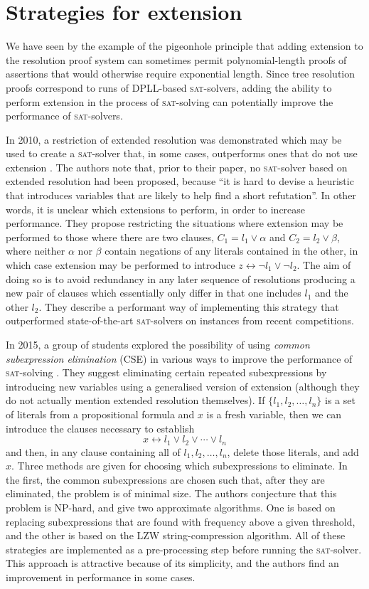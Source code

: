 \documentclass[proof,pdftex,11pt,a4]{article}
\newcommand{\sat}{\textsc{sat}}
\begin{document}
\section{Strategies for extension}

We have seen by the example of the pigeonhole principle that adding extension to the resolution proof system can sometimes permit polynomial-length proofs of assertions that would otherwise require exponential length. Since tree resolution proofs correspond to runs of DPLL-based \sat{}-solvers, adding the ability to perform extension in the process of \sat{}-solving can potentially improve the performance of \sat{}-solvers.

In 2010, a restriction of extended resolution was demonstrated which may be used to create a \sat{}-solver that, in some cases, outperforms ones that do not use extension \cite{Audemard:2010}. The authors note that, prior to their paper, no \sat{}-solver based on extended resolution had been proposed, because ``it is hard to devise a heuristic that introduces variables that are likely to help find a short refutation''. In other words, it is unclear which extensions to perform, in order to increase performance. They propose restricting the situations where extension may be performed to those where there are two clauses, $C_1 = l_1 \vee \alpha$ and $C_2 = l_2 \vee \beta$, where neither $\alpha$ nor $\beta$ contain negations of any literals contained in the other, in which case extension may be performed to introduce $z \leftrightarrow \neg l_1 \vee \neg l_2$. The aim of doing so is to avoid redundancy in any later sequence of resolutions producing a new pair of clauses which essentially only differ in that one includes $l_1$ and the other $l_2$. They describe a performant way of implementing this strategy that outperformed state-of-the-art \sat{}-solvers on instances from recent competitions.

In 2015, a group of students explored the possibility of using \emph{common subexpression elimination} (CSE) in various ways to improve the performance of \sat{}-solving \cite{Yan:2015}. They suggest eliminating certain repeated subexpressions by introducing new variables using a generalised version of extension (although they do not actually mention extended resolution themselves). If $\{l_1, l_2, \ldots, l_n\}$ is a set of literals from a propositional formula and $x$ is a fresh variable, then we can introduce the clauses necessary to establish
\[x \leftrightarrow l_1 \vee l_2 \vee \cdots \vee l_n\]
and then, in any clause containing all of $l_1, l_2, \ldots, l_n$, delete those literals, and add $x$. Three methods are given for choosing which subexpressions to eliminate. In the first, the common subexpressions are chosen such that, after they are eliminated, the problem is of minimal size. The authors conjecture that this problem is NP-hard, and give two approximate algorithms. One is based on replacing subexpressions that are found with frequency above a given threshold, and the other is based on the LZW string-compression algorithm. All of these strategies are implemented as a pre-processing step before running the \sat{}-solver. This approach is attractive because of its simplicity, and the authors find an improvement in performance in some cases.
\end{document}
